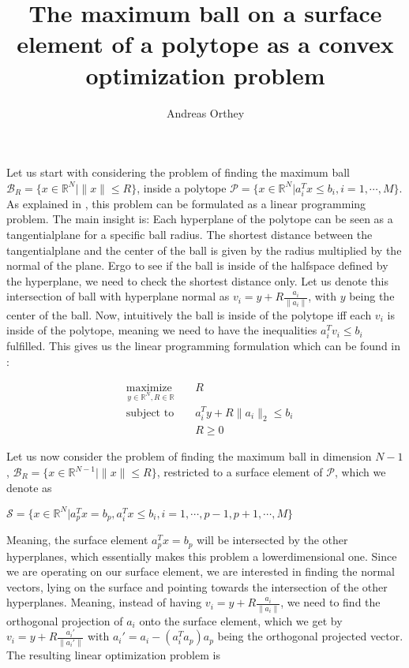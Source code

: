 \documentclass{article}
\def\R{\ensuremath{\mathbb{R}}}
\begin{document}
 

\title{The maximum ball on a surface element of a polytope as a convex
optimization problem} 
\author{Andreas Orthey}
\date{}
\maketitle



Let us start with considering the problem of finding the
maximum ball $\mathcal{B}_R=\{x \in \R^N | \|x\| \leq R\}$, inside a polytope
$\mathcal{P} = \{x \in \R^N| a_i^T x \leq b_i, i=1,\cdots,M\}$.  As explained in
\cite{boyd}, this problem can be formulated as a linear programming problem.
The main insight is: Each hyperplane of the polytope can be seen as a
tangentialplane for a specific ball radius. The shortest distance between the
tangentialplane and the center of the ball is given by the radius multiplied by
the normal of the plane. Ergo to see if the ball is inside of the halfspace
defined by the hyperplane, we need to check the shortest distance only. Let us
denote this intersection of ball with hyperplane normal as $v_i = y +
R\frac{a_i}{\|a_i\|}$, with $y$ being the center of the ball. Now, intuitively the ball is
inside of the polytope iff each $v_i$ is inside of the polytope, meaning we need
to have the inequalities $a_i^Tv_i \leq b_i$ fulfilled. This gives us the linear programming formulation which can be found in \cite{boyd}:

\begin{equation}
        \begin{aligned}
                &\underset{y \in \R^N, R \in \R}{\text{maximize }}&&R\\
                &\text{subject to }&& a_i^T y + R\|a_i\|_2 \leq b_i\\
                &&& R \geq 0
        \end{aligned}
\end{equation}

Let us now consider the problem of finding the maximum ball in dimension $N-1$, $\mathcal{B}_R=\{x
\in \R^{N-1} | \|x\| \leq R\}$, restricted to a surface element of $\mathcal{P}$, which we denote as
\begin{center}
$\mathcal{S} = \{x \in \R^N| a_p^Tx=b_p, a_i^T x \leq b_i, i=1,\cdots,p-1,p+1,\cdots,M\}$
\end{center}

Meaning, the surface element $a_p^Tx=b_p$ will be intersected by the other
hyperplanes, which essentially makes this problem a lowerdimensional one. Since
we are operating on our surface element, we are interested in finding the normal
vectors, lying on the surface and pointing towards the intersection of the other
hyperplanes. Meaning, instead of having $v_i = y + R\frac{a_i}{\|a_i\|}$, we
need to find the orthogonal projection of $a_i$ onto the surface element, which
we get by $v_i = y + R\frac{a_i'}{\|a_i'\|}$ with $a_i' = a_i -
(a_i^Ta_p)a_p$ being the orthogonal projected vector. The resulting
linear optimization problem is
\end{document}
